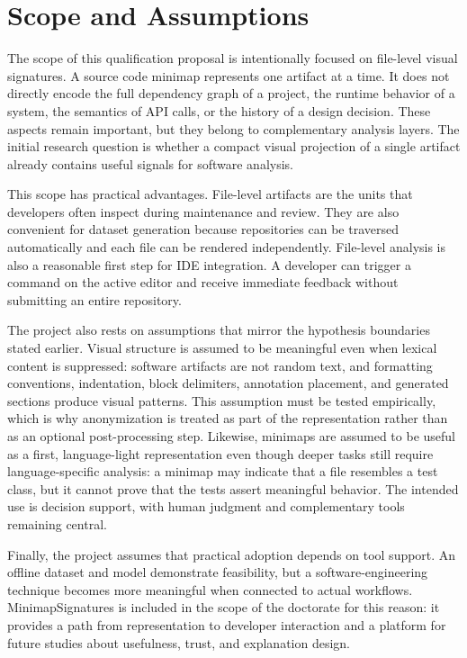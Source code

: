 \section{Scope and Assumptions}

The scope of this qualification proposal is intentionally focused on file-level
visual signatures. A source code minimap represents one artifact at a time. It
does not directly encode the full dependency graph of a project, the runtime
behavior of a system, the semantics of API calls, or the history of a design
decision. These aspects remain important, but they belong to complementary
analysis layers. The initial research question is whether a compact visual
projection of a single artifact already contains useful signals for software
analysis.

This scope has practical advantages. File-level artifacts are the units that
developers often inspect during maintenance and review. They are also convenient
for dataset generation because repositories can be traversed automatically and
each file can be rendered independently. File-level analysis is also a
reasonable first step for IDE integration. A developer can trigger a command on
the active editor and receive immediate feedback without submitting an entire
repository.

The project also rests on assumptions that mirror the hypothesis boundaries
stated earlier. Visual structure is assumed to be meaningful even when lexical
content is suppressed: software artifacts are not random text, and formatting
conventions, indentation, block delimiters, annotation placement, and generated
sections produce visual patterns. This assumption must be tested empirically,
which is why anonymization is treated as part of the representation rather than
as an optional post-processing step. Likewise, minimaps are assumed to be
useful as a first, language-light representation even though deeper tasks still
require language-specific analysis: a minimap may indicate that a file
resembles a test class, but it cannot prove that the tests assert meaningful
behavior. The intended use is decision support, with human judgment and
complementary tools remaining central.

Finally, the project assumes that practical adoption depends on tool support.
An offline dataset and model demonstrate feasibility, but a
software-engineering technique becomes more meaningful when connected to actual
workflows. MinimapSignatures is included in the scope of the doctorate for this
reason: it provides a path from representation to developer interaction and a
platform for future studies about usefulness, trust, and explanation design.

